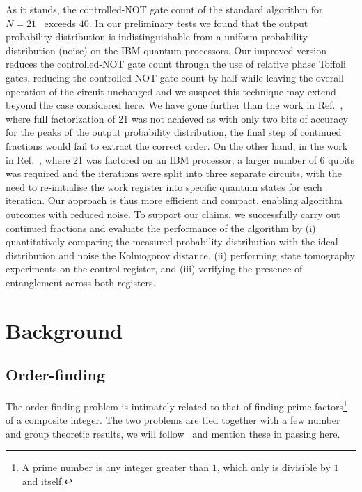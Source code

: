 \bigskip
\noindent
As it stands, the controlled-NOT gate count of the standard algorithm for $N=21$~\cite{Beauregard_2003} exceeds $40$. In our preliminary tests we found that the output probability distribution is indistinguishable from a uniform probability distribution (noise) on the IBM quantum processors. Our improved version reduces the controlled-NOT gate count through the use of relative phase Toffoli gates, reducing the controlled-NOT gate count by half while leaving the overall operation of the circuit unchanged and we suspect this technique may extend beyond the case considered here. We have gone further than the work in Ref.~\cite{Lopez_2012}, where full factorization of 21 was not achieved as with only two bits of accuracy for the peaks of the output probability distribution, the final step of continued fractions would fail to extract the correct order. On the other hand, in the work in Ref.~\cite{Amico_2019}, where 21 was factored on an IBM processor, a larger number of 6 qubits was required and the iterations were split into three separate circuits, with the need to re-initialise the work register into specific quantum states for each iteration. Our approach is thus more efficient and compact, enabling algorithm outcomes with reduced noise. To support our claims, we successfully carry out continued fractions and evaluate the performance of the algorithm by (i) quantitatively comparing the measured probability distribution with the ideal distribution and noise \via the Kolmogorov distance, (ii) performing state tomography experiments on the control register, and (iii) verifying the presence of entanglement across both registers.

\clearpage
\section{Background}

\subsection{Order-finding}

The order-finding problem is intimately related to that of finding prime factors\footnote{A prime number is any integer greater than $1$, which only is divisible by $1$ and itself.} of a composite integer. The two problems are tied together with a few number and group theoretic results, we will follow~\cite{Mike&Ike, Dewolf_2019} and mention these in passing here.

